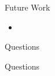 \documentclass[style=unh]{powerdot}
\begin{document}

\begin{slide}{Future Work}
  \begin{itemize}
  \item 
  \end{itemize}
\end{slide}


\begin{slide}{Questions}
\end{slide}{Questions}

\end{document}
